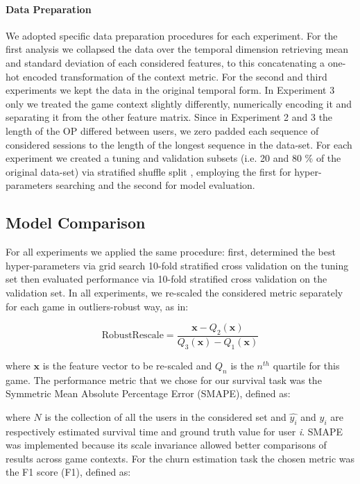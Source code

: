 

\paragraph*{Data Preparation}We adopted specific data preparation procedures for each experiment. For the first analysis we collapsed the data over the temporal dimension retrieving mean and standard deviation of each considered features, to this concatenating a one-hot encoded transformation of the context metric. For the second and third experiments we kept the data in the original temporal form. In Experiment 3 only we treated the game context slightly differently, numerically encoding it and separating it from the other feature matrix. Since in Experiment 2 and 3 the length of the OP differed between users, we zero padded each sequence of considered sessions to the length of the longest sequence in the data-set. For each experiment we created a tuning and validation subsets (i.e. 20 and 80 \% of the original data-set) via stratified shuffle split \cite{scikit-learn}, employing the first for hyper-parameters searching and the second for model evaluation.

\subsection{Model Comparison}
For all experiments we applied the same procedure: first, determined the best hyper-parameters via grid search 10-fold stratified cross validation \cite{scikit-learn} on the tuning set then evaluated performance via 10-fold stratified cross validation on the validation set. In all experiments, we re-scaled the considered metric separately for each game in outliers-robust way, as in:

\begin{equation}
\label{robustscaler}
    \text{RobustRescale}=
        \dfrac
            {\mathbf{x} - Q_2(\mathbf{x})}
            {Q_3(\mathbf{x}) - Q_1(\mathbf{x})}
\end{equation}

where $\mathbf{x}$ is the feature vector to be re-scaled and $Q_n$ is the $n^{th}$ quartile for this game. The performance metric that we chose for our survival task was the Symmetric Mean Absolute Percentage Error (SMAPE), defined as:



where $N$ is the collection of all the users in the considered set and $\hat{y_i}$ and $y_i$ are respectively estimated survival time and ground truth value for user \textit{i}. SMAPE was implemented because its scale invariance allowed better comparisons of results across game contexts. For the churn estimation task the chosen metric was the F1 score (F1), defined as:

